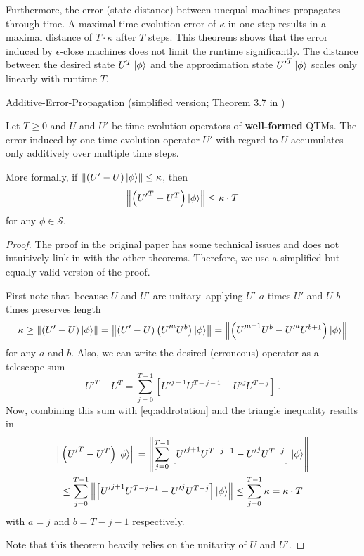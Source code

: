 Furthermore, the error (state distance) between unequal machines propagates through time.
A maximal time evolution error of $\kappa$ in one step results in a maximal distance of $T\cdot\kappa$ after $T$ steps.
This theorems shows that the error induced by $\epsilon$-close machines does not limit the runtime significantly.
The distance between the desired state $U^T\ket{\phi}$ and the approximation state ${U'}^T\ket{\phi}$ scales only linearly with runtime $T$.
\begin{theorem}
\label{th:adde}
Additive-Error-Propagation (simplified version; Theorem 3.7 in \cite{bernstein_vazirani_1997})

Let $T\geq0$ and $U$ and $U'$ be time evolution operators of \textbf{well-formed} \acp{QTM}.
The error induced by one time evolution operator $U'$ with regard to $U$ accumulates only additively over multiple time steps.

More formally, if $\left\lVert(U'-U)\ket{\phi}\right\rVert\leq\kappa$, then
\begin{equation}
    \left\lVert\left({U'}^T-U^T\right)\ket{\phi}\right\rVert\leq\kappa\cdot T
\end{equation}
for any $\phi\in\mathcal{S}$.

\begin{proof}
The proof in the original paper \cite{bernstein_vazirani_1997} has some technical issues and does not intuitively link in with the other theorems.
Therefore, we use a simplified but equally valid version of the proof.

First note that--because $U$ and $U'$ are unitary--applying $U'$ $a$ times $U'$ and $U$ $b$ times preserves length
\begin{equation}
\label{eq:addrotation}
    \kappa
    \geq\left\lVert(U'-U)\ket{\phi}\right\rVert
    =\left\lVert\left(U'-U\right)\left({U'}^aU^b\right)\ket{\phi}\right\rVert
    =\left\lVert\left({U'}^{a+1}U^b-{U'}^aU^{b+1}\right)\ket{\phi}\right\rVert
\end{equation}
for any $a$ and $b$.
Also, we can write the desired (erroneous) operator as a telescope sum
\begin{equation}
    {U'}^T-U^T
    =\sum_{j=0}^{T-1}\left[{U'}^{j+1}U^{T-j-1}-{U'}^jU^{T-j}\right]
    \ .
\end{equation}
Now, combining this sum with \cref{eq:addrotation} and the triangle inequality results in
\begin{multline}
    \left\lVert\left({U'}^T-U^T\right)\ket{\phi}\right\rVert
    =\left\lVert\sum_{j=0}^{T-1}\left[{U'}^{j+1}U^{T-j-1}-{U'}^jU^{T-j}\right]\ket{\phi}\right\rVert
    \\
    \leq\sum_{j=0}^{T-1}\left\lVert\left[{U'}^{j+1}U^{T-j-1}-{U'}^jU^{T-j}\right]\ket{\phi}\right\rVert
    \leq\sum_{j=0}^{T-1}\kappa
    =\kappa\cdot T
\end{multline}
with $a=j$ and $b=T-j-1$ respectively.

Note that this theorem heavily relies on the unitarity of $U$ and $U'$.
\end{proof}
\end{theorem}

